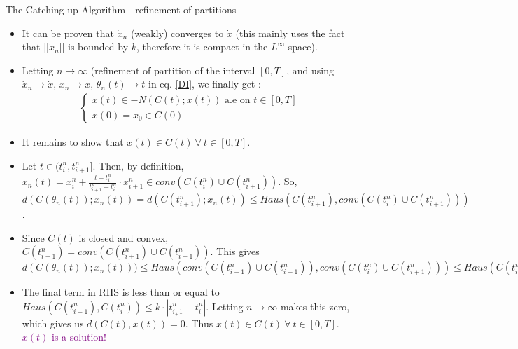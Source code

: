 \documentclass[8pt,aspectratio=169]{beamer}
\begin{document}
\begin{frame}{The Catching-up Algorithm - refinement of partitions}
    \begin{itemize}[<+->]
        \item It can be proven that $\dot{x}_n$ (weakly) converges to $\dot{x}$ (this mainly uses the fact that $||\dot{x}_n||$ is bounded by $k$, therefore it is compact in the $L^\infty$ space).
        \item Letting $n\to \infty$ (refinement of partition of the interval $[0, T]$, and using $\dot{x}_n \to \dot{x}$, $x_n \to x$, $\theta_n(t) \to t$ in eq. \ref{DI}, we finally get : 
        \begin{align*}
            \begin{cases}
           \dot{x}(t) \in -N(C(t); x(t)) \text{ a.e on } t \in [0, T]\\
            x(0) = x_0 \in C(0) 
            \end{cases}
        \end{align*}
        \item It remains to show that $x(t) \in C(t) \ \forall \ t \in [0, T]$.
    

        \item Let $t \in (t_i^n, t_{i+1}^n]$. Then, by definition, $x_n(t) = x_i^n + \frac{t - t_i^n}{t_{i+1}^n - t_i^n}\cdot x_{i+1}^n \in conv(C(t_i^n) \cup C(t_{i+1}^n))$. So, $d(C(\theta_n(t)); x_n(t)) = d(C(t_{i+1}^n); x_n(t)) \leq Haus(C(t_{i+1}^n), conv(C(t_i^n) \cup C(t_{i+1}^n)))$.
        \item Since $C(t)$ is closed and convex, $C(t_{i+1}^n) = conv(C(t_{i+1}^n) \cup C(t_{i+1}^n))$. This gives $d(C(\theta_n(t)); x_n(t))) \leq Haus(conv(C(t_{i+1}^n) \cup C(t_{i+1}^n)), conv(C(t_i^n) \cup C(t_{i+1}^n))) \leq Haus(C(t_{i+1}^n) \cup C(t_{i+1}^n), C(t_i^n) \cup C(t_{i+1}^n))$
        \item The final term in RHS is less than or equal to $Haus(C(t_{i+1}^n), C(t_i^n)) \leq k\cdot |t_{i_+1}^n - t_i^n|$. Letting $n \to \infty$ makes this zero, which gives us $d(C(t), x(t)) = 0$. Thus $x(t) \in C(t) \ \forall \ t \in [0, T]$. \textcolor{purple}{$x(t)$ is a solution!}
    \end{itemize}
\end{frame}
\end{document}
